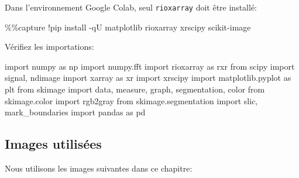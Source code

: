 \documentclass[
  11pt,
  letterpaper,
  open=any,
  twoside=false,
  french]{scrbook}
\newenvironment{Shaded}{\begin{snugshade}}{\end{snugshade}}
\newcommand{\ImportTok}[1]{\textcolor[rgb]{0.00,0.46,0.62}{#1}}
\newcommand{\NormalTok}[1]{\textcolor[rgb]{0.00,0.23,0.31}{#1}}
\newcommand{\OperatorTok}[1]{\textcolor[rgb]{0.37,0.37,0.37}{#1}}
\begin{document}
Dans l'environnement Google Colab, seul \texttt{rioxarray} doit être
installé:

\begin{Shaded}
\begin{Highlighting}[]
\OperatorTok{\%\%}\NormalTok{capture}
\OperatorTok{!}\NormalTok{pip install }\OperatorTok{{-}}\NormalTok{qU matplotlib rioxarray xrscipy scikit}\OperatorTok{{-}}\NormalTok{image}
\end{Highlighting}
\end{Shaded}

Vérifiez les importations:

\begin{Shaded}
\begin{Highlighting}[]
\ImportTok{import}\NormalTok{ numpy }\ImportTok{as}\NormalTok{ np}
\ImportTok{import}\NormalTok{ numpy.fft}
\ImportTok{import}\NormalTok{ rioxarray }\ImportTok{as}\NormalTok{ rxr}
\ImportTok{from}\NormalTok{ scipy }\ImportTok{import}\NormalTok{ signal, ndimage}
\ImportTok{import}\NormalTok{ xarray }\ImportTok{as}\NormalTok{ xr}
\ImportTok{import}\NormalTok{ xrscipy}
\ImportTok{import}\NormalTok{ matplotlib.pyplot }\ImportTok{as}\NormalTok{ plt}
\ImportTok{from}\NormalTok{ skimage }\ImportTok{import}\NormalTok{ data, measure, graph, segmentation, color}
\ImportTok{from}\NormalTok{ skimage.color }\ImportTok{import}\NormalTok{ rgb2gray}
\ImportTok{from}\NormalTok{ skimage.segmentation }\ImportTok{import}\NormalTok{ slic, mark\_boundaries}
\ImportTok{import}\NormalTok{ pandas }\ImportTok{as}\NormalTok{ pd}
\end{Highlighting}
\end{Shaded}

\subsection{Images utilisées}\label{images-utilisuxe9es-1}

Nous utilisons les images suivantes dans ce chapitre:
\end{document}
